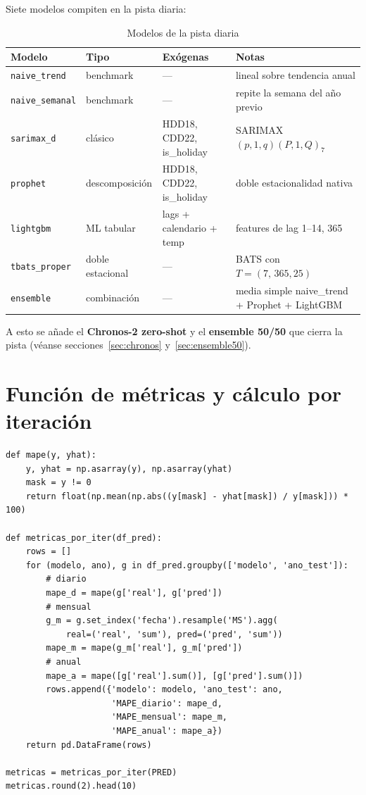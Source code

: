 \documentclass[12pt,a4paper]{article}
\begin{document}
Siete modelos compiten en la pista diaria:

\begin{table}[H]
\centering
\caption{Modelos de la pista diaria}
\begin{tabular}{llll}
\toprule
Modelo & Tipo & Exógenas & Notas \\
\midrule
\texttt{naive\_trend}    & benchmark         & ---                              & lineal sobre tendencia anual \\
\texttt{naive\_semanal}  & benchmark         & ---                              & repite la semana del año previo \\
\texttt{sarimax\_d}      & clásico           & HDD18, CDD22, is\_holiday        & SARIMAX $(p,1,q)(P,1,Q)_7$ \\
\texttt{prophet}         & descomposición    & HDD18, CDD22, is\_holiday        & doble estacionalidad nativa \\
\texttt{lightgbm}        & ML tabular        & lags + calendario + temp         & features de lag 1--14, 365 \\
\texttt{tbats\_proper}   & doble estacional  & ---                              & BATS con $T=(7,\,365{,}25)$ \\
\texttt{ensemble}        & combinación       & ---                              & media simple naive\_trend + Prophet + LightGBM \\
\bottomrule
\end{tabular}
\end{table}

\noindent
A esto se añade el \textbf{Chronos-2 zero-shot} y el \textbf{ensemble
50/50} que cierra la pista (véanse secciones~\ref{sec:chronos}
y~\ref{sec:ensemble50}).

\section{Función de métricas y cálculo por iteración}

\begin{lstlisting}[caption={Función MAPE y cálculo de métricas por modelo y ventana}]
def mape(y, yhat):
    y, yhat = np.asarray(y), np.asarray(yhat)
    mask = y != 0
    return float(np.mean(np.abs((y[mask] - yhat[mask]) / y[mask])) * 100)

def metricas_por_iter(df_pred):
    rows = []
    for (modelo, ano), g in df_pred.groupby(['modelo', 'ano_test']):
        # diario
        mape_d = mape(g['real'], g['pred'])
        # mensual
        g_m = g.set_index('fecha').resample('MS').agg(
            real=('real', 'sum'), pred=('pred', 'sum'))
        mape_m = mape(g_m['real'], g_m['pred'])
        # anual
        mape_a = mape([g['real'].sum()], [g['pred'].sum()])
        rows.append({'modelo': modelo, 'ano_test': ano,
                     'MAPE_diario': mape_d,
                     'MAPE_mensual': mape_m,
                     'MAPE_anual': mape_a})
    return pd.DataFrame(rows)

metricas = metricas_por_iter(PRED)
metricas.round(2).head(10)
\end{lstlisting}
\end{document}
